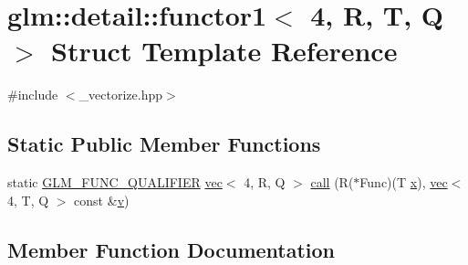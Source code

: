 \hypertarget{structglm_1_1detail_1_1functor1_3_014_00_01_r_00_01_t_00_01_q_01_4}{}\section{glm\+:\+:detail\+:\+:functor1$<$ 4, R, T, Q $>$ Struct Template Reference}
\label{structglm_1_1detail_1_1functor1_3_014_00_01_r_00_01_t_00_01_q_01_4}


{\ttfamily \#include $<$\+\_\+vectorize.\+hpp$>$}

\subsection*{Static Public Member Functions}
\begin{DoxyCompactItemize}
\item 
static \mbox{\hyperlink{setup_8hpp_a33fdea6f91c5f834105f7415e2a64407}{G\+L\+M\+\_\+\+F\+U\+N\+C\+\_\+\+Q\+U\+A\+L\+I\+F\+I\+ER}} \mbox{\hyperlink{structglm_1_1vec}{vec}}$<$ 4, R, Q $>$ \mbox{\hyperlink{structglm_1_1detail_1_1functor1_3_014_00_01_r_00_01_t_00_01_q_01_4_a2cedf8c93f72d6dd2f94d7e81eb2ce69}{call}} (R($\ast$Func)(T \mbox{\hyperlink{_s_d_l__opengl_8h_ad0e63d0edcdbd3d79554076bf309fd47}{x}}), \mbox{\hyperlink{structglm_1_1vec}{vec}}$<$ 4, T, Q $>$ const \&\mbox{\hyperlink{_s_d_l__opengl_8h_a10a82eabcb59d2fcd74acee063775f90}{v}})
\end{DoxyCompactItemize}


\subsection{Member Function Documentation}
\mbox{\label{structglm_1_1detail_1_1functor1_3_014_00_01_r_00_01_t_00_01_q_01_4_a2cedf8c93f72d6dd2f94d7e81eb2ce69}} 

